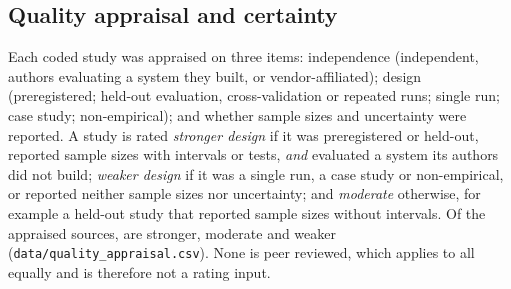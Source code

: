 \subsection{Quality appraisal and certainty}
\label{sec:appraisal}

Each coded study was appraised on three items: independence (independent, authors evaluating a system they built, or vendor-affiliated); design (preregistered; held-out evaluation, cross-validation or repeated runs; single run; case study; non-empirical); and whether sample sizes and uncertainty were reported.
A study is rated \emph{stronger design} if it was preregistered or held-out, reported sample sizes with intervals or tests, \emph{and} evaluated a system its authors did not build; \emph{weaker design} if it was a single run, a case study or non-empirical, or reported neither sample sizes nor uncertainty; and \emph{moderate} otherwise, for example a held-out study that reported sample sizes without intervals.
Of the \nAppraised{} appraised sources, \nStronger{} are stronger, \nModerate{} moderate and \nWeaker{} weaker (\nolinkurl{data/quality_appraisal.csv}).
None is peer reviewed, which applies to all equally and is therefore not a rating input.

